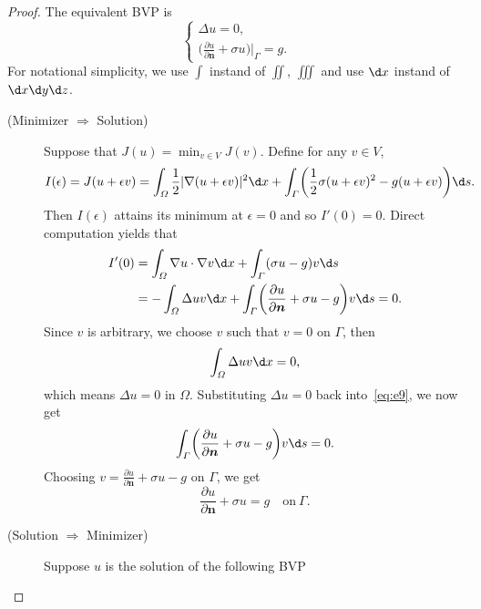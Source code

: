 \begin{proof}
  The equivalent BVP is
  \[\begin{cases}
    \Delta u = 0, \\
    \bigl(\frac{\partial u}{\partial \bm{n}} + \sigma u\bigr)\big|_{\varGamma} = g.
  \end{cases}\]
  For notational simplicity, we use $\int$ instand of $\iint$, $\iiint$ and use $\d x$
  instand of $\d x\d y\d z$.
  \begin{description}
    \item[(Minimizer $\Rightarrow$ Solution)]
      Suppose that $J(u) = \min_{v\in V} J(v)$.
      Define for any $v\in V$,
      \begin{equation}\label{eq:e8}
        I(\epsilon) = J(u+\epsilon v)
          = \int_\varOmega \frac12 |\nabla(u+\epsilon v)|^2 \d x
            + \int_\varGamma \biggl(\frac12 \sigma (u+\epsilon v)^2 - g(u+\epsilon v)\biggr) \d s.
      \end{equation}
      Then $I(\epsilon)$ attains its minimum at $\epsilon=0$ and so $I'(0)=0$.
      Direct computation yields that
      \begin{equation}\label{eq:e9}
        \begin{aligned}
          I'(0)
          & = \int_\varOmega \nabla u\cdot \nabla v \d x + \int_\varGamma (\sigma u-g)v \d s \\
          & = - \int_\varOmega \Delta u v \d x
              + \int_\varGamma \biggl(\frac{\partial u}{\partial \bm{n}} + \sigma u - g\biggr)v \d s = 0.
        \end{aligned}
      \end{equation}
      Since $v$ is arbitrary, we choose $v$ such that $v=0$ on $\varGamma$, then
      \begin{equation}\label{eq:e10}
        \int_\varOmega \Delta u v \d x = 0,
      \end{equation}
      which means $\Delta u = 0$ in $\varOmega$. Substituting $\Delta u = 0$ back into~\eqref{eq:e9},
      we now get
      \begin{equation}\label{eq:e11}
        \int_\varGamma \biggl(\frac{\partial u}{\partial \bm{n}} + \sigma u - g\biggr)v \d s = 0.
      \end{equation}
      Choosing $v = \frac{\partial u}{\partial \bm{n}} + \sigma u - g$ on $\varGamma$, we get
      \[ \frac{\partial u}{\partial \bm{n}} + \sigma u = g \quad \text{on}\ \varGamma. \]
    \item[(Solution $\Rightarrow$ Minimizer)]
      Suppose $u$ is the solution of the following BVP

\end{description}
\end{proof}
